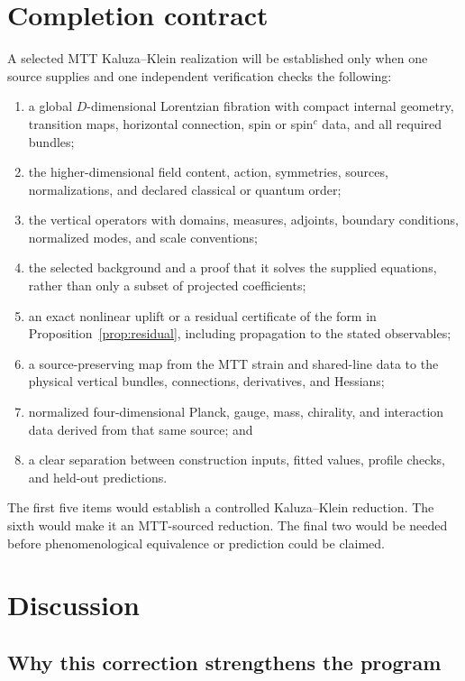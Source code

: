 \documentclass[11pt]{article}
\theoremstyle{definition}
\theoremstyle{remark}
\let\MTToriginalitem\item
\renewcommand{\item}{\par\MTToriginalitem}
\begin{document}
\section{Completion contract}
\label{sec:completion}

A selected MTT Kaluza--Klein realization will be established only when one
source supplies and one independent verification checks the following:
\begin{enumerate}[leftmargin=2em]
\item a global \(D\)-dimensional Lorentzian fibration with compact internal
      geometry, transition maps, horizontal connection, spin or
      spin\(^{c}\) data, and all required bundles;
\item the higher-dimensional field content, action, symmetries, sources,
      normalizations, and declared classical or quantum order;
\item the vertical operators with domains, measures, adjoints, boundary
      conditions, normalized modes, and scale conventions;
\item the selected background and a proof that it solves the supplied
      equations, rather than only a subset of projected coefficients;
\item an exact nonlinear uplift or a residual certificate of the form in
      Proposition~\ref{prop:residual}, including propagation to the stated
      observables;
\item a source-preserving map from the MTT strain and shared-line data to the
      physical vertical bundles, connections, derivatives, and Hessians;
\item normalized four-dimensional Planck, gauge, mass, chirality, and
      interaction data derived from that same source; and
\item a clear separation between construction inputs, fitted values,
      profile checks, and held-out predictions.
\end{enumerate}

The first five items would establish a controlled Kaluza--Klein reduction.
The sixth would make it an MTT-sourced reduction.  The final two would be
needed before phenomenological equivalence or prediction could be claimed.

\section{Discussion}
\label{sec:discussion}

\subsection{Why this correction strengthens the program}
\end{document}
